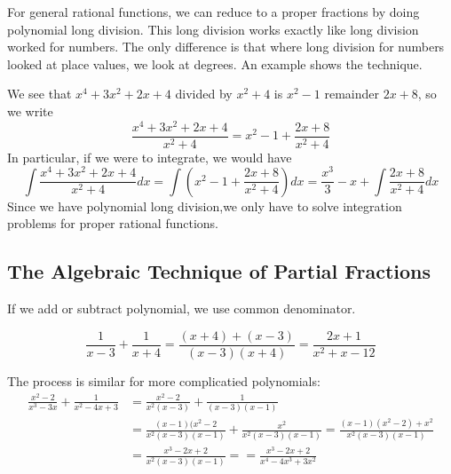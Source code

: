 \documentclass[fleqn]{report}
\begin{document}
For general rational functions, we can reduce to a proper
fractions by doing polynomial long division. This long
division works exactly like long division worked for numbers.
The only difference is that where long division for numbers
looked at place values, we look at degrees. An example shows
the technique.

\begin{example}

We see that $x^4+3x^2+2x+4$ divided by $x^2+4$ is $x^2-1$
remainder $2x+8$, so we write
\begin{equation*}
\frac{x^4+3x^2+2x+4}{x^2+4} = x^2 - 1 + \frac{2x+8}{x^2+4}
\end{equation*}
In particular, if we were to integrate, we would have 
\begin{equation*}
\int \frac{x^4+3x^2+2x+4}{x^2+4} dx = \int \left( x^2 - 1 +
\frac{2x+8}{x^2+4} \right) dx = \frac{x^3}{3} - x + \int
\frac{2x+8}{x^2+4} dx 
\end{equation*}
Since we have polynomial long division,we only have to solve
integration problems for proper rational functions. 
\end{example}

\subsection{The Algebraic Technique of Partial Fractions}
\label{partial-fractions-technique}

If we add or subtract polynomial, we use common denominator.

\begin{example}
\begin{equation*}
\frac{1}{x-3} + \frac{1}{x+4} = \frac{(x+4) +
(x-3)}{(x-3)(x+4)} = \frac{2x+1}{x^2+x-12}
\end{equation*}
\end{example}

\begin{example}
The process is similar for more complicatied polynomials:
\begin{align*}
\frac{x^2-2}{x^3-3x} + \frac{1}{x^2-4x+3} & = 
\frac{x^2-2}{x^2(x-3)} + \frac{1}{(x-3)(x-1)} \\
& = \frac{(x-1)(x^2-2}{x^2(x-3)(x-1)} + \frac{x^2}{x^2(x-3)(x-1)}
= \frac{(x-1)(x^2-2) + x^2}{x^2(x-3)(x-1)} \\
& = \frac{x^3-2x+2}{x^2(x-3)(x-1)} = 
= \frac{x^3-2x+2}{x^4 - 4x^3+ 3x^2}
\end{align*}
\end{example}
\end{document}
